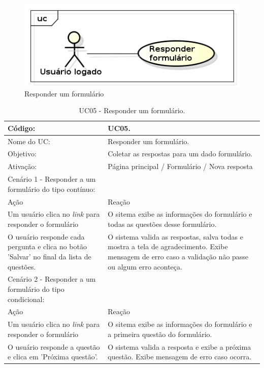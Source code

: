\documentclass[11pt]{article}
\begin{document}
        \begin{figure}[h!]
          \centering
          \includegraphics[width=.5\textwidth]{responder.png}
          \caption{Responder um formulário}
        \end{figure}

        \begin{table}[h]
          \begin{center}
            \begin{tabular}{ | p{7cm} | p{8cm} | }
              \hline
              Código: \cellcolor{gray} & UC05. \\
              \hline
              Nome do UC: \cellcolor{gray} & Responder um formulário. \\
              \hline
              Objetivo: \cellcolor{gray} & Coletar as respostas para um dado formulário. \\
              \hline
              Ativação: \cellcolor{gray} & Página principal / Formulário / Nova resposta \\
              \hline
              \hline
              Cenário 1 - Responder a um formulário do tipo contínuo: &  \\
              \hline
              Ação\cellcolor{gray} & Reação\cellcolor{gray} \\
              \hline
              Um usuário clica no {\em link} para responder o formulário & O sitema exibe as informações do formulário e todas as questões desse formulário. \\
              \hline
              O usuário responde cada pergunta e clica no botão 'Salvar' no final da lista de questões. & O sistema valida as respostas, salva todas e mostra a tela de agradecimento. Exibe mensagem de erro caso a validação não passe ou algum erro aconteça. \\
              \hline
              \hline              
              Cenário 2 - Responder a um formulário do tipo condicional: &  \\
              \hline
              Ação\cellcolor{gray} & Reação\cellcolor{gray} \\
              \hline
              Um usuário clica no {\em link} para responder o formulário & O sitema exibe as informações do formulário e a primeira questão do formulário. \\
              \hline
              O usuário responde a questão e clica em 'Próxima questão'. & O sistema valida a resposta e exibe a próxima questão. Exibe mensagem de erro caso ocorra. \\
              \hline
            \end{tabular}
            \caption{UC05 - Responder um formulário.}
          \end{center}
        \end{table}
\end{document}
